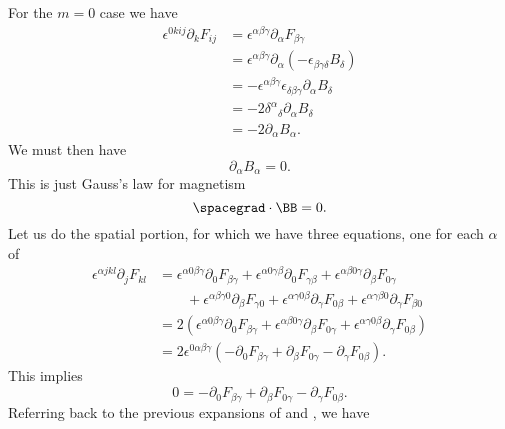 %
For the \(m= 0\) case we have
%
\begin{equation}\label{eqn:relativisticElectrodynamicsL11b:1400}
\begin{aligned}
\epsilon^{0 k i j} \partial_k F_{i j}
&=
\epsilon^{\alpha \beta \gamma} \partial_\alpha F_{\beta \gamma} \\
&=
\epsilon^{\alpha \beta \gamma} \partial_\alpha (-\epsilon_{\beta \gamma \delta} B_\delta) \\
&=
-\epsilon^{\alpha \beta \gamma} \epsilon_{\delta \beta \gamma }
\partial_\alpha B_\delta \\
&=
- 2 {\delta^\alpha}_\delta \partial_\alpha B_\delta \\
&=
- 2 \partial_\alpha B_\alpha.
\end{aligned}
\end{equation}
%
We must then have
%
\begin{equation}\label{eqn:relativisticElectrodynamicsL11:830}
\partial_\alpha B_\alpha = 0.
\end{equation}
%
This is just Gauss's law for magnetism
%
\begin{equation}\label{eqn:relativisticElectrodynamicsL11:850}
\spacegrad \cdot \BB = 0.
\end{equation}
%
Let us do the spatial portion, for which we have three equations, one for each \(\alpha\) of
%
\begin{equation}\label{eqn:relativisticElectrodynamicsL11b:1420}
\begin{aligned}
\epsilon^{\alpha j k l} \partial_j F_{k l}
&=
\epsilon^{\alpha 0 \beta \gamma} \partial_0 F_{\beta \gamma}
+\epsilon^{\alpha 0 \gamma \beta} \partial_0 F_{\gamma \beta}
+\epsilon^{\alpha \beta 0 \gamma} \partial_\beta F_{0 \gamma} \\
&\qquad +\epsilon^{\alpha \beta \gamma 0} \partial_\beta F_{\gamma 0}
+\epsilon^{\alpha \gamma 0 \beta} \partial_\gamma F_{0 \beta}
+\epsilon^{\alpha \gamma \beta 0} \partial_\gamma F_{\beta 0} \\
&=
2 \left(
\epsilon^{\alpha 0 \beta \gamma} \partial_0 F_{\beta \gamma}
+\epsilon^{\alpha \beta 0 \gamma} \partial_\beta F_{0 \gamma}
+\epsilon^{\alpha \gamma 0 \beta} \partial_\gamma F_{0 \beta}
\right) \\
&=
2 \epsilon^{0 \alpha \beta \gamma} \left(
-\partial_0 F_{\beta \gamma}
+\partial_\beta F_{0 \gamma}
- \partial_\gamma F_{0 \beta}
\right).
\end{aligned}
\end{equation}
%
This implies
%
\begin{equation}\label{eqn:relativisticElectrodynamicsL11:1320}
0 =
-\partial_0 F_{\beta \gamma}
+\partial_\beta F_{0 \gamma}
- \partial_\gamma F_{0 \beta}.
\end{equation}
%
Referring back to the previous expansions of  and , we have

